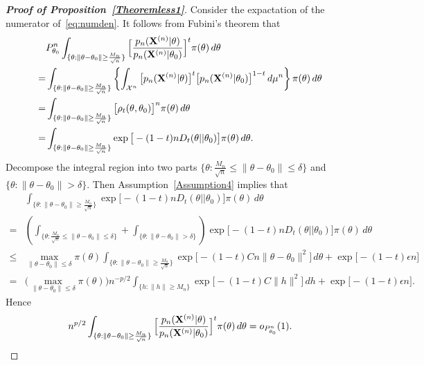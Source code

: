 \documentclass[11pt]{article}
\theoremstyle{plain}
\theoremstyle{definition}
\theoremstyle{remark}
\begin{document}
\begin{appendices}
\begin{proof}[\textbf{Proof of Proposition~\ref{Theoremless1}}]
    Consider the expactation of the numerator of~\ref{eq:numden}.
    It follows from Fubini's theorem that
\begin{align*}
    &P_{\theta_0}^n\int_{\{\theta:\|\theta-\theta_0\|\geq \frac{M_n}{\sqrt{n}}\} } \Big[ \frac{p_n(\mathbf{X}^{(n)}|\theta)}{p_n(\mathbf{X}^{(n)}|\theta_0)}  \Big]^{t} \pi(\theta) \, d \theta
    \\
    =&
    \int_{\{\theta:\|\theta-\theta_0\|\geq \frac{M_n}{\sqrt{n}}\} } \left\{\int_{\mathcal{X}^n}\big[ {p_n} (\mathbf{X}^{(n)}|\theta)\big]^t \big[ p_n (\mathbf{X}^{(n)}|\theta_0) \big]^{1-t} \, d\mu^n \right\} \pi(\theta) \, d \theta\\
    =&
    \int_{\{\theta:\|\theta-\theta_0\|\geq \frac{M_n}{\sqrt{n}}\} } \big[ \rho_{t}(\theta,\theta_0) \big]^n \pi(\theta) \, d \theta\\
    = &
    \int_{\{\theta:\|\theta-\theta_0\|\geq \frac{M_n}{\sqrt{n}}\} } \exp \big[-(1-t) n D_t(\theta||\theta_0) \big] \pi(\theta) \, d \theta.
\end{align*}
    Decompose the integral region into two parts $\{\theta:\frac{M_n}{\sqrt{n}}\leq \|\theta-\theta_0\|\leq \delta \}$ and $\{\theta: \|\theta-\theta_0\|>\delta\}$.
Then Assumption~\ref{Assumption4} implies that
\begin{align*}
    &\int_{\{\theta:\|\theta-\theta_0\|\geq \frac{M_n}{\sqrt{n}}\} } 
    \exp \big[ -(1-t) {n} D_t(\theta||\theta_0) \big] \pi(\theta) \, d \theta
    \\
    =&\left(
        \int_{\{\theta:\frac{M_n}{\sqrt{n}}\leq \|\theta-\theta_0\|\leq \delta \}}
        +
\int_{\{\theta: \|\theta-\theta_0\|>\delta\}}
    \right)
    \exp\big[ -(1-t) {n} D_t(\theta||\theta_0) \big] \pi(\theta) \, d \theta
    \\
    \leq &
    \max_{\|\theta-\theta_0\|\leq \delta}\pi(\theta)
    \int_{\big\{\theta: \|\theta-\theta_0\|\geq \frac{M_n}{\sqrt{n}} \big\}}
    \exp\big[ -(1-t)C {n} \|\theta-\theta_0\|^2 \big]
    \, d \theta
    +
    \exp\big[ -(1-t)\epsilon n\big]
    \\
    =&
    \big(\max_{\|\theta-\theta_0\|\leq \delta}\pi(\theta)\big)
    n^{-p/2}\int_{\big\{h: \|h\|\geq M_n \big\}} \exp\big[-(1-t)C \|h\|^2 \big] \, d h
    +
    \exp\big[ -(1-t)\epsilon n\big].
\end{align*}
Hence
\begin{equation}\label{Prop4:eq2}
    n^{p/2}\int_{\{\theta:\|\theta-\theta_0\|\geq \frac{M_n}{\sqrt{n}}\} } \Big[ \frac{p_n(\mathbf{X}^{(n)}|\theta)}{p_n(\mathbf{X}^{(n)}|\theta_0)}  \Big]^{t} \pi(\theta) \, d \theta
    =o_{P^n_{\theta_0}}(1).
\end{equation}


\end{proof}
\end{appendices}
\end{document}
